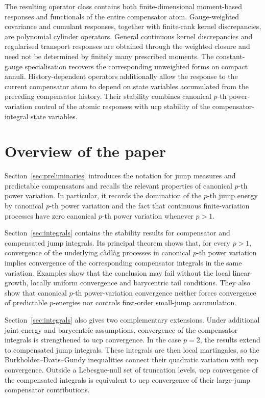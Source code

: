 \documentclass[a4paper,10pt]{article}
\begin{document}
The resulting operator class contains both finite-dimensional
moment-based responses and functionals of the entire compensator atom.
Gauge-weighted covariance and cumulant responses, together with
finite-rank kernel discrepancies, are polynomial cylinder operators.
General continuous kernel discrepancies and regularised transport
responses are obtained through the weighted closure and need not be
determined by finitely many prescribed moments. The constant-gauge
specialisation recovers the corresponding unweighted forms on compact
annuli. History-dependent operators additionally allow the response
to the current compensator atom to depend on state variables
accumulated from the preceding compensator history. Their stability
combines canonical \(p\)-th power-variation control of the atomic
responses with ucp stability of the compensator-integral state
variables.



\section{Overview of the paper}


Section~\ref{sec:preliminaries} introduces the notation for jump
measures and predictable compensators and recalls the relevant
properties of canonical \(p\)-th power variation. In particular, it
records the domination of the \(p\)-th jump energy by canonical
\(p\)-th power variation and the fact that continuous
finite-variation processes have zero canonical \(p\)-th power
variation whenever \(p>1\).

Section~\ref{sec:integrals} contains the stability results for
compensator and compensated jump integrals. Its principal theorem
shows that, for every \(p>1\), convergence of the underlying
càdlàg processes in canonical \(p\)-th power variation implies
convergence of the corresponding compensator integrals in the same
variation. Examples show that the conclusion may fail
without the local linear-growth, locally uniform convergence and
barycentric tail conditions. They also show that canonical
\(p\)-th power-variation convergence neither forces convergence of
predictable \(p\)-energies nor controls first-order small-jump
accumulation.

Section~\ref{sec:integrals} also gives two complementary extensions.
Under additional joint-energy and barycentric assumptions, convergence
of the compensator integrals is strengthened to ucp convergence. In
the case \(p=2\), the results extend to compensated jump integrals.
These integrals are then local martingales, so the
Burkholder--Davis--Gundy inequalities connect their quadratic
variation with ucp convergence. Outside a Lebesgue-null set of
truncation levels, ucp convergence of the compensated integrals is
equivalent to ucp convergence of their large-jump compensator
contributions.
\end{document}
